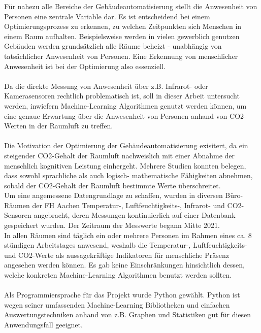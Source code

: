 Für nahezu alle Bereiche der Gebäudeautomatisierung stellt die Anwesenheit 
von Personen eine zentrale Variable dar. Es ist entscheidend bei einem Optimierungsprozess zu erkennen, zu
welchen Zeitpunkten sich Menschen in einem Raum aufhalten. Beispielsweise werden in vielen gewerblich 
genutzen Gebäuden werden grundsätzlich alle Räume beheizt - unabhängig von tatsächlicher Anwesenheit von Personen. 
Eine Erkennung von menschlicher Anwesenheit ist bei der Optimierung also essenziell.\\\\
Da die direkte Messung von Anwesenheit über z.B. Infrarot- oder Kamerasensoren rechtlich problematisch ist, 
soll in dieser Arbeit untersucht werden, inwiefern Machine-Learning Algorithmen genutzt werden können, 
um eine genaue Erwartung über die Anwesenheit von Personen anhand von CO2-Werten in der Raumluft zu treffen.\\\\
Die Motivation der Optimierung der Gebäudeautomatisierung exisitert, da ein steigender CO2-Gehalt der 
Raumluft nachweislich mit einer Abnahme der menschlich kognitiven Leistung einhergeht. Mehrere Studien
konnten belegen, dass sowohl sprachliche als auch logisch- mathematische Fähigkeiten abnehmen, sobald 
der CO2-Gehalt der  Raumluft bestimmte Werte überschreitet.\\ 
Um eine angemessene Datengrundlage zu schaffen, wurden in diversen Büro-Räumen der FH Aachen Temperatur-,
Luftfeuchtigkeits-, Infrarot- und CO2-Sensoren angebracht, deren Messungen kontinuierlich auf einer Datenbank
gespeichert wurden. Der Zeitraum der Messwerte begann Mitte 2021.\\
In allen Räumen sind täglich ein oder mehrere
Personen im Rahmen eines ca. 8 stündigen Arbeitstages anwesend, weshalb die Temperatur-, Luftfeuchtigkeits-
und CO2-Werte als aussagekräftige Indikatoren für menschliche Präsenz angesehen werden können.
Es gab keine Einschränkungen hinsichtlich dessen, welche konkreten Machine-Learning Algorithmen 
benutzt werden sollten.\\\\
Als Programmiersprache für das Projekt wurde Python gewählt. Python ist wegen seiner umfassenden
Machine-Learning Bibliotheken und einfachen Auswertungstechniken anhand von z.B. Graphen und Statistiken 
gut für diesen Anwendungsfall geeignet.






